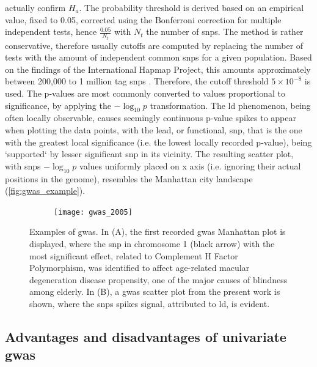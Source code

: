 actually confirm $H_a$. The probability threshold is derived based on an empirical value, fixed to 0.05, corrected using the Bonferroni correction for multiple independent tests, hence $\frac{0.05}{N_t}$ with $N_t$ the number of \acp{snp}. The method is rather conservative, therefore usually cutoffs are computed by replacing the number of tests with the amount of independent common \acp{snp} for a given population. Based on the findings of the International Hapmap Project, this amounts approximately between 200,000 to 1 million tag \acp{snp} \cite{Belmont2003}. Therefore, the cutoff threshold $5\times 10 ^ {-8}$ is used. The p-values are most commonly converted to values proportional to significance, by applying the $-\log_{10}{p}$ transformation.   The \ac{ld} phenomenon, being often locally observable, causes seemingly continuous p-value spikes to appear when plotting the data points, with the lead, or functional, \ac{snp}, that is the one with the greatest local significance (i.e. the lowest locally recorded p-value), being `supported` by lesser significant \ac{snp} in its vicinity. The resulting scatter plot, with \acp{snp} $-\log_{10}{p}$ values uniformly placed on x axis (i.e. ignoring their actual positions in the genome), resembles the Manhattan city landscape (\autoref{fig:gwas_example}).

 \begin{figure}[H]
 	\begin{subfigure}[t]{0.45\textwidth}
	\centering
	\texttt{[image: gwas\_2005]}
	\caption{}
	\label{fig:gwas_2005}
	\end{subfigure}
	\hfill
	\begin{subfigure}[t]{0.6\textwidth}
		\centering
		
		\caption{}
		\label{fig:gwas_example}
	\end{subfigure}
	\caption[Examples of \acs{gwas} Manhattan plots \cite{Klein2005}]{Examples of \ac{gwas}. In (A), the first recorded \ac{gwas} Manhattan plot \cite{Klein2005} is displayed, where the \ac{snp} in chromosome 1 (black arrow) with the most significant  effect, related to Complement H Factor Polymorphism, was identified to affect age-related macular degeneration disease propensity, one of the major causes of blindness among elderly. In (B), a \ac{gwas} scatter plot from the present work is shown, where the \acp{snp} spikes signal, attributed to \ac{ld}, is evident.}
\end{figure}

\subsection{Advantages and disadvantages of univariate \ac{gwas}}

